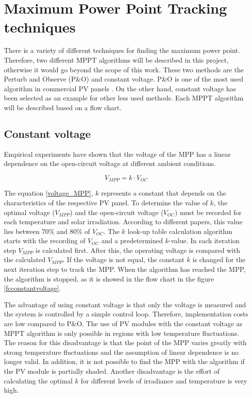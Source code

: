 \section{Maximum Power Point Tracking techniques\label{MPPTalgo}}

There is a variety of different techniques for finding the maximum power point. Therefore, two different MPPT algorithms will be described in this project, otherwise it would go beyond the scope of this work. These two methods are the Perturb and Observe (P\&O) and constant voltage. P\&O is one of the most used algorithm in commercial PV panels \cite{Dezso}. On the other hand, constant voltage has been selected as an example for other less used methods. Each MPPT algorithm will be described based on a flow chart. 

\subsection{Constant voltage}
Empirical experiments have shown that the voltage of the MPP has a linear dependence on the open-circuit voltage at different ambient conditions\cite{flowchartVC}.

\begin{equation} \label{voltage_MPP}
V_{MPP} = k \cdot V_{OC}	
\end{equation} 

The equation \ref{voltage_MPP}, $k$ represents a constant that depends on the characteristics of the respective PV panel. To determine the value of $k$, the optimal voltage ($V_{MPP}$) and the open-circuit voltage ($V_{OC}$) must be recorded for each temperature and solar irradiation. According to different papers, this value lies between 70\% and 80\% of $V_{OC}$\cite{MPPTResearch}.
The $k$ look-up table calculation algorithm starts with the recording of $V_{OC}$ and a predetermined $k$-value. In each iteration step $V_{MPP}$ is calculated first. After this, the operating voltage is compared with the calculated $V_{MPP}$. If the voltage is not equal, the constant $k$ is changed for the next iteration step to track the MPP. When the algorithm has reached the MPP, the algorithm is stopped, as it is showed in the flow chart in the figure \ref{fcconstantvoltage}. \cite{flowchartVC}

The advantage of using constant voltage is that only the voltage is measured and the system is controlled by a simple control loop. Therefore, implementation costs are low compared to P\&O. The use of PV modules with the constant voltage as MPPT algorithm is only possible in regions with low temperature fluctuations. The reason for this disadvantage is that the point of the MPP varies greatly with strong temperature fluctuations and the assumption of linear dependence is no longer valid. In addition, it is not possible to find the MPP with the algorithm if the PV module is partially shaded. Another disadvantage is the effort of calculating the optimal $k$ for different levels of irradiance and temperature is very high.\cite{flowchartVC}

